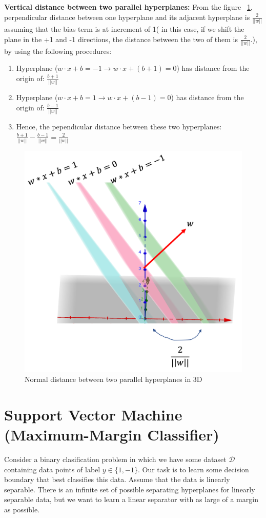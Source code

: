 \documentclass[11pt]{article}
\def\DD{\mathcal{D}}
\begin{document}
\textbf{Vertical distance between two parallel hyperplanes:} From the figure ~\ref{fig:sfig5}, perpendicular distance between one hyperplane and its adjacent hyperplane is $\frac{2}{||w||}$ assuming that the bias term is at increment of 1( in this case, if we shift the plane in the +1 and -1 directions, the distance between the two of them is $\frac{2}{||w||}$.), by using the following procedures:
\begin{enumerate}
    \item Hyperplane ($w \cdot x + b = -1 \rightarrow w \cdot x + (b+1) = 0$) has distance from the origin of: $\frac{b+1}{||w||}$
     \item Hyperplane ($w \cdot x + b = 1 \rightarrow w \cdot x + (b-1) = 0$) has distance from the origin of: $\frac{b-1}{||w||}$
    \item Hence, the pependicular distance between these two hyperplanes: $\frac{b+1}{||w||} - \frac{b-1}{||w||} = \frac{2}{||w||}$
\end{enumerate}

\begin{figure}[H]
  \centering
  \includegraphics[width=.49\linewidth]{images/3dparallel.png}
  \caption{Normal distance between two parallel hyperplanes in 3D}
  \label{fig:sfig5}
\end{figure}


\section{Support Vector Machine (Maximum-Margin Classifier)}
Consider a binary clasification problem in which we have some dataset $\DD$ containing data points of label $y \in \{1, -1\}$. Our task is to learn some decision boundary that best classifies this data. Assume that the data is linearly separable. There is an infinite set of possible separating hyperplanes for linearly separable data, but we want to learn a linear separator with as large of a margin as possible.
\end{document}
